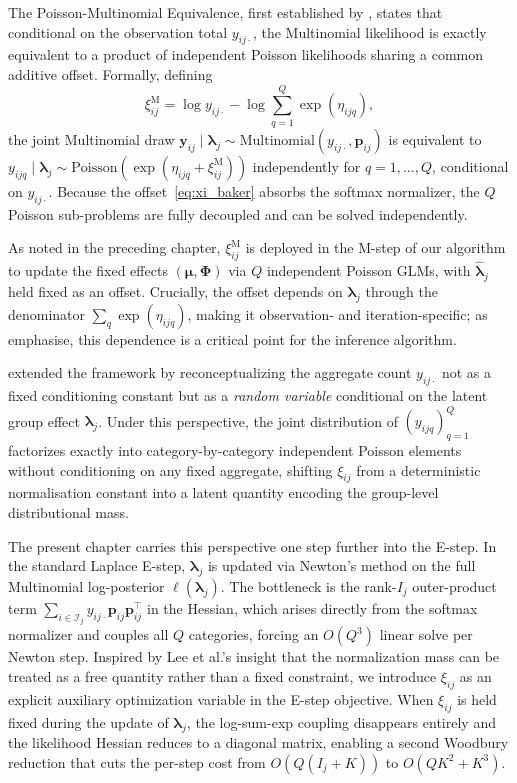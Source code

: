 \documentclass[]{report}
\theoremstyle{definition}
\begin{document}
The Poisson-Multinomial Equivalence, first established by \citet{10.2307/2348134}, states that conditional on the observation total $y_{ij\cdot}$, the Multinomial likelihood is exactly equivalent to a product of independent Poisson likelihoods sharing a common additive offset. Formally, defining
\begin{equation}
    \xi_{ij}^{\mathrm{M}} = \log y_{ij\cdot} - \log\sum_{q=1}^Q \exp(\eta_{ijq}),
    \label{eq:xi_baker}
\end{equation}
the joint Multinomial draw $\bm{y}_{ij} \mid \bm{\lambda}_{j} \sim \mathrm{Multinomial}(y_{ij\cdot}, \bm{p}_{ij})$ is equivalent to $y_{ijq} \mid \bm{\lambda}_{j} \sim \mathrm{Poisson}(\exp(\eta_{ijq} + \xi_{ij}^{\mathrm{M}}))$ independently for $q = 1, \ldots, Q$, conditional on $y_{ij\cdot}$. Because the offset~\eqref{eq:xi_baker} absorbs the softmax normalizer, the $Q$ Poisson sub-problems are fully decoupled and can be solved independently.

As noted in the preceding chapter, $\xi_{ij}^{\mathrm{M}}$ is deployed in the M-step of our algorithm to update the fixed effects $(\bm{\mu}, \bm{\Phi})$ via $Q$ independent Poisson GLMs, with $\hat{\bm{\lambda}}_j$ held fixed as an offset. Crucially, the offset depends on $\bm{\lambda}_j$ through the denominator $\sum_q \exp(\eta_{ijq})$, making it observation- and iteration-specific; as \citet{lee2017poissontrickextensionsfitting} emphasise, this dependence is a critical point for the inference algorithm.

\citet{lee2017poissontrickextensionsfitting} extended the \citet{10.2307/2348134} framework by reconceptualizing the aggregate count $y_{ij\cdot}$ not as a fixed conditioning constant but as a \emph{random variable} conditional on the latent group effect $\bm{\lambda}_j$. Under this perspective, the joint distribution of $(y_{ijq})_{q=1}^Q$ factorizes exactly into category-by-category independent Poisson elements without conditioning on any fixed aggregate, shifting $\xi_{ij}$ from a deterministic normalisation constant into a latent quantity encoding the group-level distributional mass.

The present chapter carries this perspective one step further into the E-step. In the standard Laplace E-step, $\bm{\lambda}_j$ is updated via Newton's method on the full Multinomial log-posterior $\ell(\bm{\lambda}_j)$. The bottleneck is the rank-$I_j$ outer-product term $\sum_{i \in \mathcal{I}_j} y_{ij\cdot} \bm{p}_{ij} \bm{p}_{ij}^\top$ in the Hessian, which arises directly from the softmax normalizer and couples all $Q$ categories, forcing an $O(Q^3)$ linear solve per Newton step. Inspired by Lee et al.'s insight that the normalization mass can be treated as a free quantity rather than a fixed constraint, we introduce $\xi_{ij}$ as an explicit auxiliary optimization variable in the E-step objective. When $\xi_{ij}$ is held fixed during the update of $\bm{\lambda}_j$, the log-sum-exp coupling disappears entirely and the likelihood Hessian reduces to a diagonal matrix, enabling a second Woodbury reduction that cuts the per-step cost from $O(Q(I_j + K))$ to $O(QK^2 + K^3)$.
\end{document}
